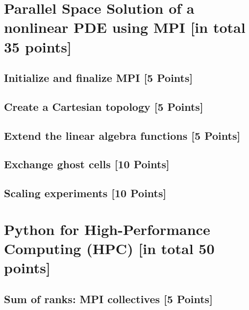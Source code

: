 \documentclass[unicode,11pt,a4paper,oneside,numbers=endperiod,openany]{scrartcl}
\begin{document}
\setassignment
{}

\newline


\section{Parallel Space Solution of a nonlinear PDE using MPI [in total 35 points]}

\subsection{Initialize and finalize MPI [5 Points]}

\subsection{Create a Cartesian topology [5 Points]}

\subsection{Extend the linear algebra functions [5 Points]}

\subsection{Exchange ghost cells [10 Points]}

\subsection{Scaling experiments [10 Points]}



\section{Python for High-Performance Computing (HPC) [in total 50 points]}

\subsection{Sum of ranks: MPI collectives [5 Points]}
\end{document}
